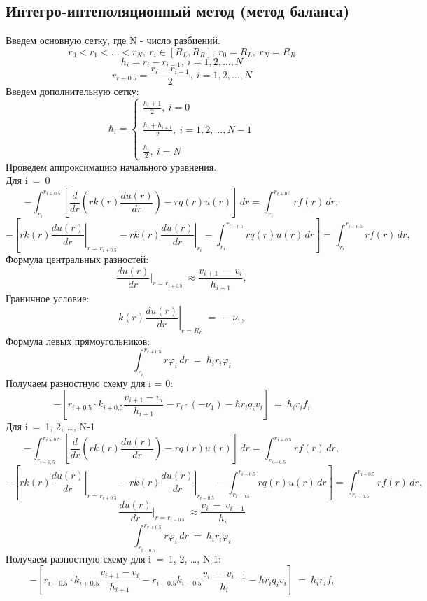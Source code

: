 \subsection{Интегро-интеполяционный метод (метод баланса)}

Введем основную сетку, где N - число разбиений.
\[r_0 < r_1 < \dots < r_N,\ r_i \in [R_L, R_R],\ r_0 = R_L,\ r_N = R_R\]
\[
  h_i =r_i - r_{i-1},\ i=1,2, \dots, N
\]
\[
  r_{r-0.5} = \frac{r_i - r_{i-1}}{2},\ i=1,2, \dots, N
\]
Введем дополнительную сетку:
\[
  \hbar_i = \begin{cases}
    \frac{h_i + 1}{2},\ i = 0 \\ \\
    \frac{h_i + h_{i+1}}{2},\ i = 1, 2, \dots, N-1 \\ \\
    \frac{h_i}{2},\ i = N
  \end{cases}
\]
Проведем аппроксимацию начального уравнения.\\
Для i\ =\ 0
\[ -\int_{r_i}^{r_{i+0.5}} \left[\frac{d}{dr}\left(r k(r) \frac{du(r)}{dr}\right) -r q(r)u(r)\right]  \,dr = \int_{r_i}^{r_{i+0.5}} r f(r) \,dr, \]
\[	-\left[r k(r)\left.\frac{du(r)}{dr} \right\vert_{r=r_{i+0.5}} - r k(r) \left. \frac{du(r)}{dr}\right\vert_{r_i} - \int_{r_i}^{r_{i+0.5}} r q(r) u(r)  \,dr \right]
  = \int_{r_i}^{r_{i+0.5}} r f(r) \,dr, \]
Формула центральных разностей:
\[	\frac{du(r)}{dr}\vert_{r = r_{i+0.5}}\ \approx \frac{v_{i+1}\ -\ v_i}{h_{i+1}}, \]
Граничное условие:
\[	k(r) \left. \frac{du(r)}{dr}\right\vert_{r=R_L}\ =\ -\nu_1, \]
Формула левых прямоугольников:
\[	\int_{r_i}^{r_{r+0.5}} r \varphi_i \,dr\ =\ \hbar_i r_i \varphi_i \]
Получаем разностную схему для i = 0:
\[
  -\left[ r_{i+0.5} \cdot k_{i+0.5}\frac{v_{i+1}-v_i}{h_{i+1}} - r_i \cdot (-\nu_1) - \hbar r_i q_i v_i \right]\ =\ \hbar_ir_if_i
\]
Для i\ =\ 1, 2, \dots, N-1
\[ -\int_{r_{i-0,5}}^{r_{i+0.5}} \left[\frac{d}{dr}\left(r k(r) \frac{du(r)}{dr}\right) -r q(r)u(r)\right]  \,dr = \int_{r_{i-0.5}}^{r_{i+0.5}} r f(r) \,dr, \]
\[	-\left[r k(r)\left.\frac{du(r)}{dr} \right\vert_{r=r_{i+0.5}} - r k(r) \left. \frac{du(r)}{dr}\right\vert_{r_{i-0.5}} - \int_{r_{i-0.5}}^{r_{i+0.5}} r q(r) u(r)  \,dr \right]
= \int_{r_{i-0.5}}^{r_{i+0.5}} r f(r) \,dr, \]
\[\frac{du(r)}{dr}\vert_{r = r_{i-0.5}}\ \approx \frac{v_{i}\ -\ v_{i-1}}{h_{i}}\]
\[ \int_{r_{i-0.5}}^{r_{r+0.5}} r \varphi_i \,dr\ =\ \hbar_i r_i \varphi_i \]
Получаем разностную схему для i\ =\ 1, 2, \dots, N-1:
\[
  -\left[ r_{i+0.5} \cdot k_{i+0.5}\frac{v_{i+1}-v_i}{h_{i+1}} - r_{i-0.5}k_{i-0.5}\frac{v_{i}\ -\ v_{i-1}}{h_{i}} - \hbar r_i q_i v_i\right]\ =\ \hbar_ir_if_i
\]
